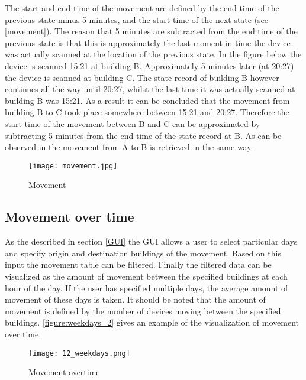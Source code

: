 The start and end time of the movement are defined by the end time of the previous state minus 5 minutes, and the start time of the next state (see \autoref{movement}). The reason that 5 minutes are subtracted from the end time of the previous state is that this is approximately the last moment in time the device was actually scanned at the location of the previous state. In the figure below the device is scanned 15:21 at building B. Approximately 5 minutes later (at 20:27) the device is scanned at building C. The state record of building B however continues all the way until 20:27, whilst the last time it was actually scanned at building B was 15:21. As a result it can be concluded that the movement from building B to C took place somewhere between 15:21 and 20:27. Therefore the start time of the movement between B and C can be approximated by subtracting 5 minutes from the end time of the state record at B. As can be observed in the movement from A to B is retrieved in the same way.

\begin{figure}[H]
\centering
\texttt{[image: movement.jpg]}
\captionsetup{justification=centering}
\caption{Movement}
\label{figure:movement}
\end{figure}


\subsection{Movement over time}

As the described in section \autoref{GUI} the GUI allows a user to select particular days and specify origin and destination buildings of the movement. Based on this input the movement table can be filtered. Finally the filtered data can be visualized as the amount of movement between the specified buildings at each hour of the day. If the user has specified multiple days, the average amount of movement of these days is taken. It should be noted that the amount of movement is defined by the number of devices moving between the specified buildings. \autoref{figure:weekdays_2} gives an example of the visualization of movement over time.
\begin{figure}[H]
\centering
\texttt{[image: 12\_weekdays.png]}
\captionsetup{justification=centering}
\caption{Movement overtime}
\label{figure:weekdays_2}
\end{figure}


